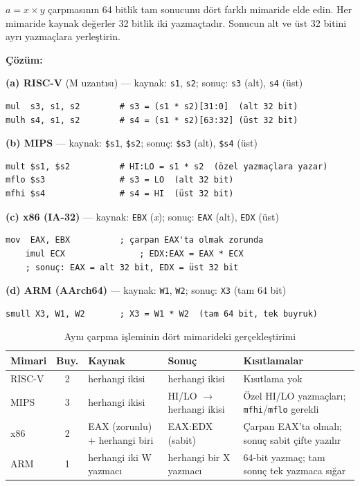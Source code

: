\begin{ornek}[3.11]
\label{orn:carpma-64bit}
$a = x \times y$ çarpmasının 64 bitlik tam sonucunu dört farklı mimaride elde edin. Her mimaride kaynak değerler 32 bitlik iki yazmaçtadır. Sonucun alt ve üst 32 bitini ayrı yazmaçlara yerleştirin.

\textbf{Çözüm:}

\textbf{(a) RISC-V} (M uzantısı) --- kaynak: \texttt{s1}, \texttt{s2}; sonuç: \texttt{s3} (alt), \texttt{s4} (üst)
\begin{lstlisting}[style=riscv]
mul  s3, s1, s2        # s3 = (s1 * s2)[31:0]  (alt 32 bit)
mulh s4, s1, s2        # s4 = (s1 * s2)[63:32] (üst 32 bit)
\end{lstlisting}

\textbf{(b) MIPS} --- kaynak: \texttt{\$s1}, \texttt{\$s2}; sonuç: \texttt{\$s3} (alt), \texttt{\$s4} (üst)
\begin{lstlisting}[style=mips]
mult $s1, $s2          # HI:LO = s1 * s2  (özel yazmaçlara yazar)
mflo $s3               # s3 = LO  (alt 32 bit)
mfhi $s4               # s4 = HI  (üst 32 bit)
\end{lstlisting}

\textbf{(c) x86 (IA-32)} --- kaynak: \texttt{EBX} (\emph{x}); sonuç: \texttt{EAX} (alt), \texttt{EDX} (üst)
\begin{lstlisting}[language={}, morecomment={[l]{;}}, texcl=true]
    mov  EAX, EBX          ; çarpan EAX'ta olmak zorunda
    imul ECX               ; EDX:EAX = EAX * ECX
    ; sonuç: EAX = alt 32 bit, EDX = üst 32 bit
\end{lstlisting}

\textbf{(d) ARM (AArch64)} --- kaynak: \texttt{W1}, \texttt{W2}; sonuç: \texttt{X3} (tam 64 bit)
\begin{lstlisting}[language={}, morecomment={[l]{;}}, texcl=true]
    smull X3, W1, W2       ; X3 = W1 * W2  (tam 64 bit, tek buyruk)
\end{lstlisting}

\medskip
\begin{table}[H]
\centering
\caption{Aynı çarpma işleminin dört mimarideki gerçekleştirimi}
\label{tab:carpma-karsilastirma-kod}
\footnotesize
\begin{tabular}{lcp{2.5cm}p{2.5cm}p{4cm}}
\toprule
\textbf{Mimari} & \textbf{Buy.} & \textbf{Kaynak} & \textbf{Sonuç} & \textbf{Kısıtlamalar} \\
\midrule
RISC-V  & 2 & herhangi ikisi & herhangi ikisi & Kısıtlama yok \\[2pt]
MIPS    & 3 & herhangi ikisi & HI/LO $\to$ herhangi ikisi & Özel HI/LO yazmaçları; \texttt{mfhi}/\texttt{mflo} gerekli \\[2pt]
x86     & 2 & EAX (zorunlu) + herhangi biri & EAX:EDX (sabit) & Çarpan EAX'ta olmalı; sonuç sabit çifte yazılır \\[2pt]
ARM     & 1 & herhangi iki W yazmacı & herhangi bir X yazmacı & 64-bit yazmaç; tam sonuç tek yazmaca sığar \\
\bottomrule
\end{tabular}
\end{table}


\end{ornek}
